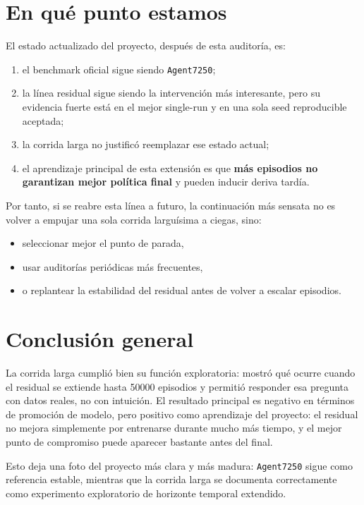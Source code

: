 \documentclass[11pt,a4paper]{article}
\begin{document}
\section*{En qu\'e punto estamos}
El estado actualizado del proyecto, despu\'es de esta auditor\'ia, es:
\begin{enumerate}
    \item el benchmark oficial sigue siendo \texttt{Agent7250};
    \item la l\'inea residual sigue siendo la intervenci\'on m\'as interesante, pero su evidencia fuerte est\'a en el mejor single-run y en una sola seed reproducible aceptada;
    \item la corrida larga no justific\'o reemplazar ese estado actual;
    \item el aprendizaje principal de esta extensi\'on es que \textbf{m\'as episodios no garantizan mejor pol\'itica final} y pueden inducir deriva tard\'ia.
\end{enumerate}

Por tanto, si se reabre esta l\'inea a futuro, la continuaci\'on m\'as sensata no es volver a empujar una sola corrida largu\'isima a ciegas, sino:
\begin{itemize}
    \item seleccionar mejor el punto de parada,
    \item usar auditor\'ias peri\'odicas m\'as frecuentes,
    \item o replantear la estabilidad del residual antes de volver a escalar episodios.
\end{itemize}

\section*{Conclusi\'on general}
La corrida larga cumpli\'o bien su funci\'on exploratoria: mostr\'o qu\'e ocurre cuando el residual se extiende hasta 50000 episodios y permiti\'o responder esa pregunta con datos reales, no con intuici\'on. El resultado principal es negativo en t\'erminos de promoci\'on de modelo, pero positivo como aprendizaje del proyecto: el residual no mejora simplemente por entrenarse durante mucho m\'as tiempo, y el mejor punto de compromiso puede aparecer bastante antes del final.

Esto deja una foto del proyecto m\'as clara y m\'as madura: \texttt{Agent7250} sigue como referencia estable, mientras que la corrida larga se documenta correctamente como experimento exploratorio de horizonte temporal extendido.
\end{document}
